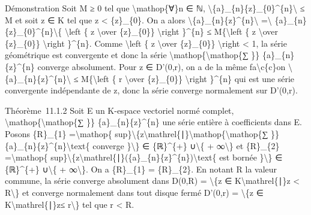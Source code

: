 \documentclass[]{article}
\begin{document}
Démonstration Soit M ≥ 0 tel que \textbackslash{}mathop\{∀\}n ∈ ℕ,
\textbackslash{}\textbar{}\{a\}\_\{n\}\{z\}\_\{0\}\^{}\{n\}\textbackslash{}\textbar{}
≤ M et soit z ∈ K tel que \textbar{}z\textbar{} \textless{}
\textbar{}\{z\}\_\{0\}\textbar{}. On a alors
\textbackslash{}\textbar{}\{a\}\_\{n\}\{z\}\^{}\{n\}\textbackslash{}\textbar{}
=\textbackslash{}\textbar{}
\{a\}\_\{n\}\{z\}\_\{0\}\^{}\{n\}\textbackslash{}\textbar{}\{
\textbackslash{}left \textbar{}\{ z \textbackslash{}over \{z\}\_\{0\}\}
\textbackslash{}right \textbar{}\}\^{}\{n\} ≤ M\{\textbackslash{}left
\textbar{}\{ z \textbackslash{}over \{z\}\_\{0\}\} \textbackslash{}right
\textbar{}\}\^{}\{n\}. Comme \textbackslash{}left \textbar{}\{ z
\textbackslash{}over \{z\}\_\{0\}\} \textbackslash{}right \textbar{}
\textless{} 1, la série géométrique est convergente et donc la série
\textbackslash{}mathop\{\textbackslash{}mathop\{∑ \}\}
\{a\}\_\{n\}\{z\}\^{}\{n\} converge absolument. Pour z ∈ D'(0,r), on a
de la même fa\textbackslash{}c\{c\}on
\textbackslash{}\textbar{}\{a\}\_\{n\}\{z\}\^{}\{n\}\textbackslash{}\textbar{}
≤ M\{\textbackslash{}left \textbar{}\{ r \textbackslash{}over
\{z\}\_\{0\}\} \textbackslash{}right \textbar{}\}\^{}\{n\} qui est une
série convergente indépendante de z, donc la série converge normalement
sur D'(0,r).

Théorème~11.1.2 Soit E un K-espace vectoriel normé complet,
\textbackslash{}mathop\{\textbackslash{}mathop\{∑ \}\}
\{a\}\_\{n\}\{z\}\^{}\{n\} une série entière à coefficients dans E.
Posons \{R\}\_\{1\} =\textbackslash{}mathop\{
sup\}\textbackslash{}\{\textbar{}z\textbar{}\textbackslash{}mathrel\{∣\}\textbackslash{}mathop\{\textbackslash{}mathop\{∑
\}\} \{a\}\_\{n\}\{z\}\^{}\{n\}\textbackslash{}text\{ converge
\}\textbackslash{}\} ∈ \{ℝ\}\^{}\{+\} ∪\textbackslash{}\{ +
∞\textbackslash{}\} et \{R\}\_\{2\} =\textbackslash{}mathop\{
sup\}\textbackslash{}\{\textbar{}z\textbar{}\textbackslash{}mathrel\{∣\}(\{a\}\_\{n\}\{z\}\^{}\{n\})\textbackslash{}text\{
est bornée \}\textbackslash{}\} ∈ \{ℝ\}\^{}\{+\} ∪\textbackslash{}\{ +
∞\textbackslash{}\}. On a \{R\}\_\{1\} = \{R\}\_\{2\}. En notant R la
valeur commune, la série converge absolument dans D(0,R) =
\textbackslash{}\{z ∈ K\textbackslash{}mathrel\{∣\}\textbar{}z\textbar{}
\textless{} R\textbackslash{}\} et converge normalement dans tout disque
fermé D'(0,r) = \textbackslash{}\{z ∈
K\textbackslash{}mathrel\{∣\}\textbar{}z\textbar{}≤ r\textbackslash{}\}
tel que r \textless{} R.
\end{document}
